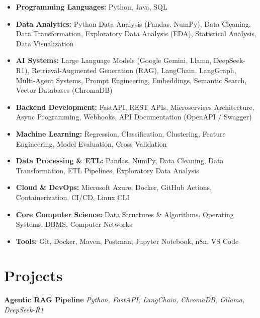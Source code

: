 \documentclass[10pt]{article}
\begin{document}
\begin{itemize}[leftmargin=*, itemsep=2pt]

\item \textbf{Programming Languages:}
Python, Java, SQL

\item \textbf{Data Analytics:}
Python Data Analysis (Pandas, NumPy), Data Cleaning, Data Transformation,
Exploratory Data Analysis (EDA), Statistical Analysis, Data Visualization

\item \textbf{AI Systems:}
Large Language Models (Google Gemini, Llama, DeepSeek-R1), Retrieval-Augmented Generation (RAG),
LangChain, LangGraph, Multi-Agent Systems, Prompt Engineering, Embeddings,
Semantic Search, Vector Databases (ChromaDB)

\item \textbf{Backend Development:}
FastAPI, REST APIs, Microservices Architecture, Async Programming,
Webhooks, API Documentation (OpenAPI / Swagger)

\item \textbf{Machine Learning:}
Regression, Classification, Clustering, Feature Engineering,
Model Evaluation, Cross Validation

\item \textbf{Data Processing & ETL:}
Pandas, NumPy, Data Cleaning, Data Transformation,
ETL Pipelines, Exploratory Data Analysis

\item \textbf{Cloud & DevOps:}
Microsoft Azure, Docker, GitHub Actions, Containerization, CI/CD, Linux CLI

\item \textbf{Core Computer Science:}
Data Structures & Algorithms, Operating Systems, DBMS, Computer Networks

\item \textbf{Tools:}
Git, Docker, Maven, Postman, Jupyter Notebook, n8n, VS Code

\end{itemize}

\section*{Projects}

\textbf{Agentic RAG Pipeline} \hfill \textit{Python, FastAPI, LangChain, ChromaDB, Ollama, DeepSeek-R1}
\end{document}
